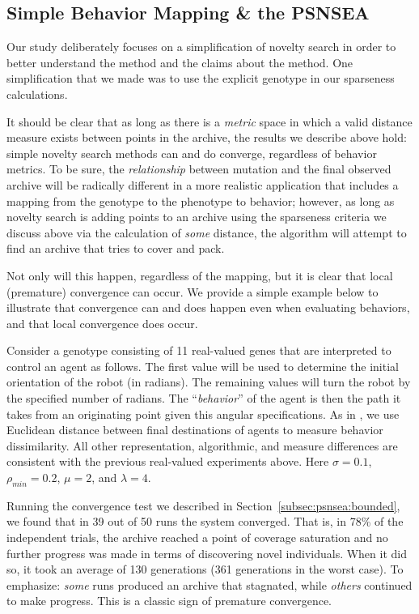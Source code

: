 \documentclass[twoside]{article}
\begin{document}
\subsection{Simple Behavior Mapping \& the PSNSEA}
\label{subsec:behavior}

Our study deliberately focuses on a simplification of novelty search in order to better understand the method and the claims about the method.  One simplification that we made was to use the explicit genotype in our sparseness calculations.

It should be clear that as long as there is a \emph{metric} space in which a valid distance measure exists between points in the archive, the results we describe above hold:  simple novelty search methods can and do converge, regardless of behavior metrics.  To be sure, the \emph{relationship} between mutation and the final observed archive will be radically different in a more realistic application that includes a mapping from the genotype to the phenotype to behavior; however, as long as novelty search is adding points to an archive using the sparseness criteria we discuss above via the calculation of \emph{some} distance, the algorithm will attempt to find an archive that tries to cover and pack.  

Not only will this happen, regardless of the mapping, but it is clear that local (premature) convergence can occur.  We provide a simple example below to illustrate that convergence can and does happen even when evaluating behaviors, and that local convergence does occur.

Consider a genotype consisting of 11 real-valued genes that are interpreted to control an agent as follows.  The first value will be used to determine the initial orientation of the robot (in radians).  The remaining values will turn the robot by the specified number of radians.  The ``\emph{behavior}'' of the agent is then the path it takes from an originating point given this angular specifications.  As in \citet{LehmanStanley2008ssls}, we use Euclidean distance between final destinations of agents to measure behavior dissimilarity.  All other representation, algorithmic, and measure differences are consistent with the previous real-valued experiments above.  Here $\sigma=0.1$, $\rho_{min} = 0.2$, $\mu=2$, and $\lambda=4$.

Running the convergence test we described in Section~\ref{subsec:psnsea:bounded}, we found that in 39 out of 50 runs the system converged.  That is, in 78\% of the independent trials, the archive reached a point of coverage saturation and no further progress was made in terms of discovering novel individuals.  When it did so, it took an average of 130 generations (361 generations in the worst case).  To emphasize:  \emph{some} runs produced an archive that stagnated, while \emph{others} continued to make progress.  This is a classic sign of premature convergence.
\end{document}
